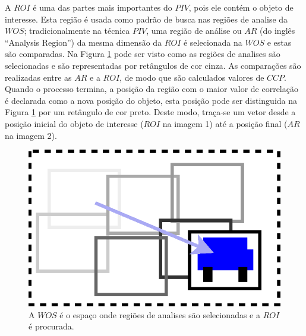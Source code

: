 A $ROI$ é uma das partes mais importantes do $PIV$, pois ele contém o objeto de interesse. 
Esta região é usada como padrão de busca nas regiões de analise da $WOS$;
tradicionalmente na técnica $PIV$, uma região de análise ou $AR$ (do inglês ``Analysis Region'') da mesma dimensão 
da $ROI$ é selecionada na $WOS$ e estas são comparadas.
Na Figura \ref{fig:WOSdivided} pode ser visto como as regiões 
de analises são selecionadas e são representadas por retângulos de cor cinza.
As comparações são realizadas entre as $AR$ e a $ROI$, de modo que são 
calculados valores de $CCP$. Quando o processo termina, a posição da região com o maior valor
de correlação é declarada como a nova posição do objeto, esta posição pode ser distinguida na Figura \ref{fig:WOSdivided}
por um retângulo de cor preto. Deste modo, traça-se um vetor desde a posição inicial do objeto 
de interesse ($ROI$ na imagem 1) até a posição final ($AR$ na imagem 2).
\begin{figure}[H]
\includegraphics[width=0.8\columnwidth]{images/WOSdivided.eps}
\caption{A $WOS$ é o espaço onde regiões de analises são selecionadas e a $ROI$ é procurada.}
\label{fig:WOSdivided}
\end{figure}

